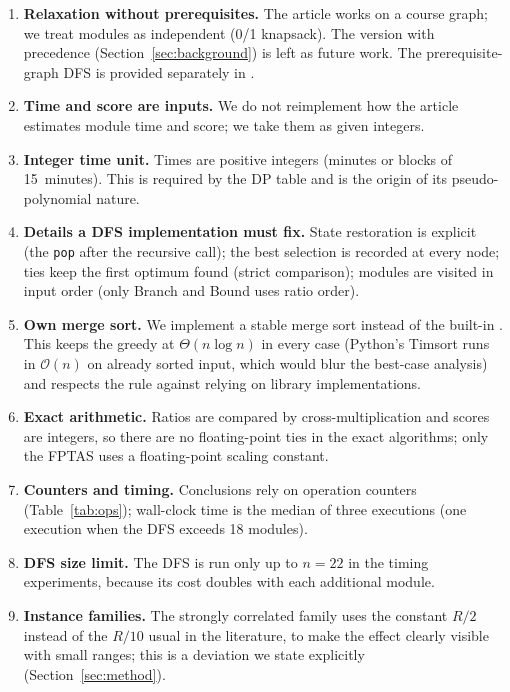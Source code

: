 \begin{enumerate}[leftmargin=1.6em,itemsep=2pt]
\item \textbf{Relaxation without prerequisites.} The article works on a course graph; we treat modules as independent (0/1 knapsack). The version with precedence (Section~\ref{sec:background}) is left as future work. The prerequisite-graph DFS is provided separately in .
\item \textbf{Time and score are inputs.} We do not reimplement how the article estimates module time and score; we take them as given integers.
\item \textbf{Integer time unit.} Times are positive integers (minutes or blocks of 15~minutes). This is required by the DP table and is the origin of its pseudo-polynomial nature.
\item \textbf{Details a DFS implementation must fix.} State restoration is explicit (the \texttt{pop} after the recursive call); the best selection is recorded at every node; ties keep the first optimum found (strict comparison); modules are visited in input order (only Branch and Bound uses ratio order).
\item \textbf{Own merge sort.} We implement a stable merge sort instead of the built-in . This keeps the greedy at $\Theta(n\log n)$ in every case (Python's Timsort runs in $\mathcal{O}(n)$ on already sorted input, which would blur the best-case analysis) and respects the rule against relying on library implementations.
\item \textbf{Exact arithmetic.} Ratios are compared by cross-multiplication and scores are integers, so there are no floating-point ties in the exact algorithms; only the FPTAS uses a floating-point scaling constant.
\item \textbf{Counters and timing.} Conclusions rely on operation counters (Table~\ref{tab:ops}); wall-clock time is the median of three executions (one execution when the DFS exceeds 18 modules).
\item \textbf{DFS size limit.} The DFS is run only up to $n=22$ in the timing experiments, because its cost doubles with each additional module.
\item \textbf{Instance families.} The strongly correlated family uses the constant $R/2$ instead of the $R/10$ usual in the literature, to make the effect clearly visible with small ranges; this is a deviation we state explicitly (Section~\ref{sec:method}).
\end{enumerate}
